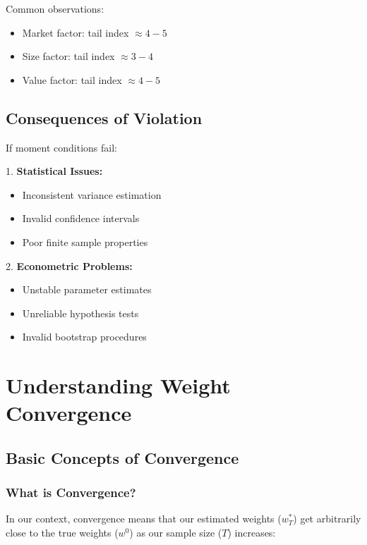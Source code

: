 \documentclass[12pt,article]{memoir}
\begin{document}
Common observations:
\begin{itemize}
    \item Market factor: tail index $\approx 4-5$
    \item Size factor: tail index $\approx 3-4$
    \item Value factor: tail index $\approx 4-5$
\end{itemize}

\subsection{Consequences of Violation}

If moment conditions fail:

1. \textbf{Statistical Issues:}
   \begin{itemize}
       \item Inconsistent variance estimation
       \item Invalid confidence intervals
       \item Poor finite sample properties
   \end{itemize}

2. \textbf{Econometric Problems:}
   \begin{itemize}
       \item Unstable parameter estimates
       \item Unreliable hypothesis tests
       \item Invalid bootstrap procedures
   \end{itemize}


\section{Understanding Weight Convergence}

\subsection{Basic Concepts of Convergence}

\subsubsection{What is Convergence?}

In our context, convergence means that our estimated weights ($w_T^*$) get arbitrarily close to the true weights ($w^0$) as our sample size ($T$) increases:
\end{document}
